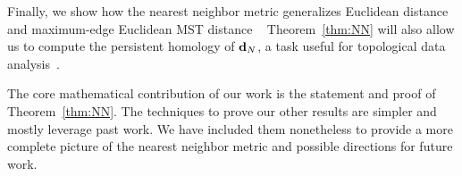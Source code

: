 Finally, we show how the nearest neighbor metric generalizes Euclidean
distance and maximum-edge Euclidean MST distance ~\cite{LiWan2001}
Theorem~\ref{thm:NN} will also allow us
to compute the persistent homology of $\mathbf{d}_N$, a task useful for
topological data analysis~\cite{edelsbrunner02topological}. 

The core mathematical contribution of our work is the
statement and proof of Theorem~\ref{thm:NN}.  The techniques to prove
our other results are simpler and mostly leverage past work. We have
included them
nonetheless to provide a more complete picture of the nearest neighbor
metric and possible directions for future work.

